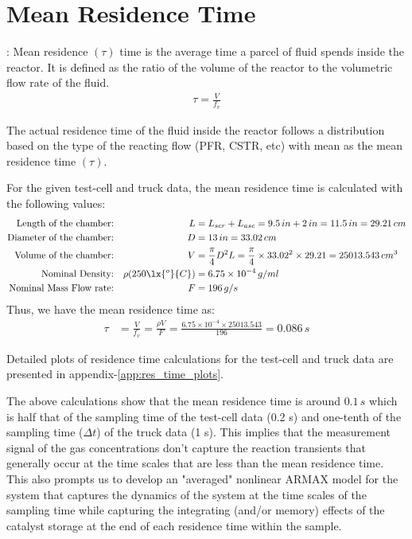 \newpage
\section{Mean Residence Time}

: Mean residence $(\tau)$ time is the average time a parcel of fluid spends inside the reactor. It is
defined as the ratio of the volume of the reactor to the volumetric flow rate of the fluid.
\begin{align}
    \tau = \frac{V}{f_v}
\end{align}

The actual residence time of the fluid inside the reactor follows a distribution based on the type of the reacting flow
(PFR, CSTR, etc) with mean as the mean residence time $(\tau)$.

For the given test-cell and truck data, the mean residence time is calculated with the following values:
\begin{align*}
    \text{Length of the chamber:}&&
    L &= L_{scr} + L_{asc} = 9.5 \, in  + 2 \, in = 11.5 \, in = 29.21 \, cm\\
    \text{Diameter of the chamber:} &&
    D &= 13 \, in = 33.02 \, cm\\
    \text{Volume of the chamber:} &&
    V &= \frac{\pi}{4} D^2 L = \frac{\pi}{4} \times 33.02^2 \times 29.21 = 25013.543 \, cm^3\\
    \text{Nominal Density:} &&
    \rho(250 \lx{^o}{C}) &= 6.75 \times 10^{-4} \, g/ml\\
    \text{Nominal Mass Flow rate:} &&
    F &= 196 \, g/s
\end{align*}
Thus, we have the mean residence time as:
\begin{align}
    \tau &= \frac{V}{f_v} = \frac{\rho V}{F} = \frac{6.75 \times 10^{-4} \times 25013.543}{196} = 0.086 \, s
\end{align}

Detailed plots of residence time calculations for the test-cell and truck data are presented in
appendix-\ref{app:res_time_plots}.

The above calculations show that the mean residence time is around $0.1 \, s$ which is half that of the sampling time of
the test-cell data (0.2 s) and one-tenth of the sampling time ($\Delta t$) of the truck data (1 s). This implies that
the measurement signal of the gas concentrations don't capture the reaction transients that generally occur at the time
scales  that are less than the mean residence time. This also prompts us to develop an "averaged" nonlinear ARMAX model
for the system that captures the dynamics of the system at the time scales of the sampling time while capturing the
integrating (and/or memory) effects of the catalyst storage at the end of each residence time within the sample.

